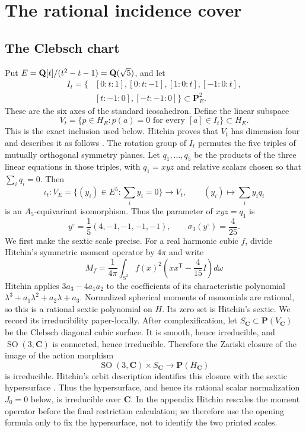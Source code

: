 \section{The rational incidence cover}
\label{sec:cover}

\subsection{The Clebsch chart}

Put \(E=\mathbf Q[t]/(t^2-t-1)=\mathbf Q(\sqrt5)\), and let
\[
\begin{aligned}
 I_t=\{&
 [0:t:1],[0:t:-1],[1:0:t],[-1:0:t],\\
 & [t:-1:0],[-t:-1:0]\}\subset\mathbf P^2_E .
\end{aligned}
\]
These are the six axes of the standard icosahedron.  Define the linear
subspace
\[
 V_t=\{p\in H_E:p(a)=0\text{ for every }[a]\in I_t\}\subset H_E.
\]
This is the exact inclusion used below.  Hitchin proves that \(V_t\) has
dimension four and describes it as follows
\cite[\S\S2--4]{HitchinIcosahedron}.  The rotation group of \(I_t\) permutes
the five triples of mutually orthogonal symmetry planes.  Let
\(q_1,\ldots,q_5\) be the products of the three linear equations in those
triples, with \(q_1=xyz\) and relative scalars chosen so that
\(\sum_iq_i=0\).  Then
\[
 \iota_t:V_E=\{(y_i)\in E^5:\textstyle\sum_i y_i=0\}
   \longrightarrow V_t,\qquad
 (y_i)\longmapsto\sum_i y_iq_i
\]
is an \(A_5\)-equivariant isomorphism.  Thus the parameter of \(xyz=q_1\)
is
\[
 y^\circ=\frac15(4,-1,-1,-1,-1),\qquad
 \sigma_3(y^\circ)=\frac4{25}.
\]
We first make the sextic scale precise.  For a real harmonic cubic \(f\),
divide Hitchin's symmetric moment operator by \(4\pi\) and write
\[
 M_f=\frac1{4\pi}\int_{S^2}f(x)^2
       \left(xx^{\mathsf T}-\frac4{15}I\right)d\omega
\]
Hitchin applies \(3a_3-4a_1a_2\) to the coefficients of its characteristic
polynomial
\(\lambda^3+a_1\lambda^2+a_2\lambda+a_3\).  Normalized spherical moments
of monomials are rational, so this is a rational sextic polynomial on
\(H\).  Its zero set is Hitchin's sextic.  We record its irreducibility
paper-locally.  After complexification, let
\(S_{\mathbf C}\subset\mathbf P(V_{\mathbf C})\) be the Clebsch diagonal
cubic surface.  It is smooth, hence irreducible, and
\(\operatorname{SO}(3,\mathbf C)\) is connected, hence irreducible.  Therefore
the Zariski closure of the image of the action morphism
\[
 \operatorname{SO}(3,\mathbf C)\times S_{\mathbf C}
 \longrightarrow \mathbf P(H_{\mathbf C})
\]
is irreducible.  Hitchin's orbit description identifies this closure with
the sextic hypersurface \cite[\S9]{HitchinIcosahedron}.  Thus the hypersurface,
and hence its rational scalar normalization \(J_0=0\) below, is irreducible
over \(\mathbf C\).  In the appendix Hitchin rescales the moment operator
before the final restriction calculation; we therefore use the opening
formula only to fix the hypersurface, not to identify the two printed scales.

